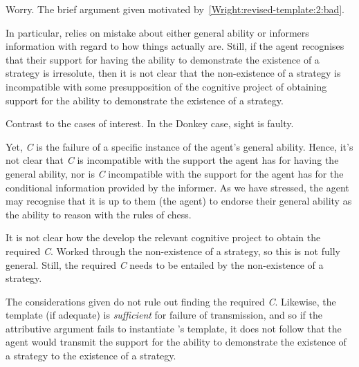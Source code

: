 \documentclass[10pt]{article}
\newcommand{\hozline}[0]{%
  \noindent\hdashrule[0.5ex][c]{\textwidth}{.1pt}{}
}
\begin{document}
\begin{note}
  Worry.
  The brief argument given motivated by~\ref{Wright:revised-template:2:bad}.

  In particular, relies on mistake about either general ability or informers information with regard to how things actually are.
  Still, if the agent recognises that their support for having the ability to demonstrate the existence of a strategy is irresolute, then it is not clear that the non-existence of a strategy is incompatible with some presupposition of the cognitive project of obtaining support for the ability to demonstrate the existence of a strategy.

  Contrast to the cases of interest.
  In the Donkey case, sight is faulty.

  Yet, \emph{C} is the failure of a specific instance of the agent's general ability.
  Hence, it's not clear that \emph{C} is incompatible with the support the agent has for having the general ability, nor is \emph{C} incompatible with the support for the agent has for the conditional information provided by the informer.
  As we have stressed, the agent may recognise that it is up to them (the agent) to endorse their general ability as the ability to reason with the rules of chess.

  It is not clear how the develop the relevant cognitive project to obtain the required \emph{C}.
  Worked through the non-existence of a strategy, so this is not fully general.
  Still, the required \emph{C} needs to be entailed by the non-existence of a strategy.
\end{note}

\begin{note}
  The considerations given do not rule out finding the required \emph{C}.
  Likewise, the template (if adequate) is \emph{sufficient} for failure of transmission, and so if the attributive argument fails to instantiate \citeauthor{Wright:2011wn}'s template, it does not follow that the agent would transmit the support for the ability to demonstrate the existence of a strategy to the existence of a strategy.
\end{note}

\hozline
\end{document}
